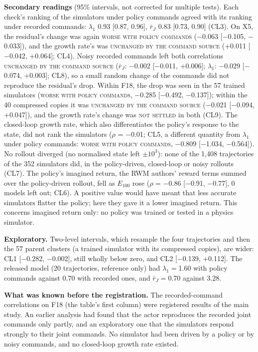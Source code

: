 \textbf{Secondary readings} (95\% intervals, not corrected for multiple tests). Each check's ranking of the
simulators under policy commands agreed with its ranking under recorded commands: $\lambda_1$
0.93 [0.87, 0.96], $\bar r_J$ 0.83 [0.73, 0.90] (CL3). On X5, the
residual's change was again \textsc{worse with policy commands} ($-$0.063 [$-$0.105, $-$0.033]), and the growth
rate's was \textsc{unchanged by the command source} (+0.011 [$-$0.042, +0.064]; CL4). Noisy recorded commands left
both correlations \textsc{unchanged by the command source} ($\bar r_J$: $-$0.002 [$-$0.011, +0.006]; $\lambda_1$:
$-$0.029 [$-$0.074, +0.003]; CL8), so a small random change of the commands did not reproduce the
residual's drop. Within F18, the drop was seen in the 57 trained simulators
(\textsc{worse with policy commands}, $-$0.285 [$-$0.492, $-$0.137]); within the
40 compressed copies it was \textsc{unchanged by the command source}
($-$0.021 [$-$0.094, +0.047]), and the growth rate's change was
\textsc{not settled} in both (CL9). The closed-loop growth rate, which also differentiates the
policy's response to the state, did not rank the simulators ($\rho$ = $-$0.01; CL5, a different quantity from $\lambda_1$ under policy commands:
\textsc{worse with policy commands}, $-$0.809 [$-$1.034, $-$0.564]). No rollout diverged (no normalised state left $\pm10^3$): none of the 1{,}408
trajectories of the 352 simulators did, in the policy-driven, closed-loop or noisy rollouts (CL7). The policy's imagined return, the RWM authors' reward terms summed over the policy-driven rollout, fell as
$E_{100}$ rose ($\rho$ = $-$0.86 [$-$0.91, $-$0.77], 0 models left out; CL6). A positive value
would have meant that less accurate simulators flatter the policy; here they gave it a lower imagined return. This
concerns imagined return only: no policy was trained or tested in a physics simulator.

\textbf{Exploratory.} Two-level intervals, which resample the four trajectories and then the
57 parent clusters (a trained simulator with its compressed copies), are wider: CL1 [$-$0.282, $-$0.002], still wholly below zero, and CL2
[$-$0.139, +0.112]. The released model (20 trajectories, reference only) had $\lambda_1={}$1.60
with policy commands against 0.70 with recorded ones, and $\bar r_J={}$0.70 against
3.28.

\textbf{What was known before the registration.} The recorded-command correlations on F18 (the table's first column)
were registered results of the main study. An earlier analysis had found that the actor reproduces the recorded joint
commands only partly, and an exploratory one that the simulators respond strongly to their joint commands. No
simulator had been driven by a policy or by noisy commands, and no closed-loop growth rate existed.

